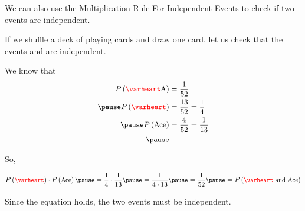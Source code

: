 \documentclass{beamer}
\newcommand{\suitheart}[1][]{{\color{red}\text{#1}\varheart}}
\newcommand{\card}[2]{{#1{\color{black}\text{#2}}}}
\newcommand{\prob}[1]{P\left(#1\right)}
\begin{document}
\begin{frame}
\begin{note}
We can also use the Multiplication Rule For Independent Events to check if two events are independent.
\end{note}\pause

\begin{example}
If we shuffle a deck of playing cards and draw one card, let us check that the events  and  are independent.\pause

\vspace{1mm}
We know that
\begin{equation*}\small
\begin{aligned}
\prob{\card{\suitheart}{A}} &= \dfrac{1}{52} \\\pause
\prob{\suitheart} &= \dfrac{13}{52} = \dfrac{1}{4} \\\pause
\prob{\text{Ace}} &= \dfrac{4}{52} = \dfrac{1}{13} \\\pause
\end{aligned}
\end{equation*}

\vspace{-7mm}
So,

\vspace{-2mm}
\begin{equation*}\small
\prob{\suitheart}\cdot\prob{\text{Ace}}\pause
= \dfrac{1}{4}\cdot\dfrac{1}{13}\pause
= \dfrac{1}{4\cdot 13}\pause
= \dfrac{1}{52}\pause
= \prob{\suitheart~\text{and}~\text{Ace}}
\end{equation*}\pause

\vspace{-3mm}
Since the equation holds, the two events must be independent.
\end{example}
\end{frame}
\end{document}

